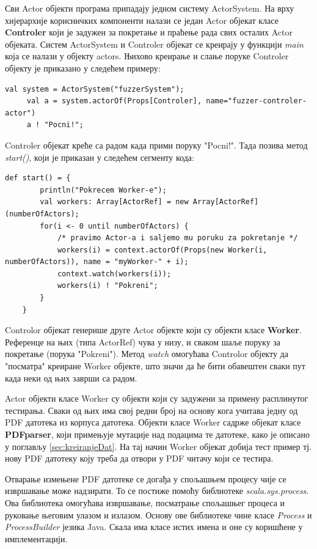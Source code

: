 \documentclass[12pt,oneside]{memoir}
\begin{document}
Сви Actor објекти програма припадају једном систему ActorSystem. На врху хијерархије корисничких компоненти налази се један Actor објекат класе \textbf{Controler} који је задужен за покретање и праћење рада свих осталих Actor објеката. Систем ActorSystem и Controler објекат се креирају у функцији \textit{main} која се налази у објекту actors.  Њихово креирање и слање поруке Controler објекту је приказано у следећем примеру:

\begin{lstlisting}[frame=single]
     val system = ActorSystem("fuzzerSystem");
     val a = system.actorOf(Props[Controler], name="fuzzer-controler-actor")
     a ! "Pocni!";
\end{lstlisting}

Controler објекат креће са радом када прими поруку "Pocni!". Тада позива метод \textit{start()}, који је приказан у следећем сегменту кода:

\begin{lstlisting}[frame=single]
    def start() = {
        println("Pokrecem Worker-e");
        val workers: Array[ActorRef] = new Array[ActorRef](numberOfActors);
        for(i <- 0 until numberOfActors) {
            /* pravimo Actor-a i saljemo mu poruku za pokretanje */
            workers(i) = context.actorOf(Props(new Worker(i, numberOfActors)), name = "myWorker-" + i);
            context.watch(workers(i));
            workers(i) ! "Pokreni";
        }
    }
\end{lstlisting}

Controlor објекат генерише друге Actor објекте који су објекти класе \textbf{Worker}. Референце на њих (типа ActorRef) чува у низу, и сваком шаље поруку за покретање (порука "Pokreni"). Метод \textit{watch} омогућава Controlor објекту да "посматра" креиране Worker објекте, што значи да ће бити обавештен сваки пут када неки од њих заврши са радом.

Actor објекти класе Worker су објекти који су задужени за примену расплинутог тестирања. Сваки од њих има свој редни број на основу кога учитава једну од PDF датотека из корпуса датотека. Објекти класе Worker садрже објекат класе \textbf{PDFparser}, који примењује мутације над подацима те датотеке, како је описано у поглављу \ref{sec:kreiranjeDat}. На тај начин Worker објекат добија тест пример тј. нову PDF датотеку коју треба да отвори у PDF читачу који се тестира.
 
Отварање измењене PDF датотеке се догађа у спољашњем процесу чије се извршавање може надзирати. То се постиже помоћу библиотеке \textit{scala.sys.process}. Ова библиотека омогућава извршавање, посматрање спољашњег процеса и руковање његовим улазом и излазом. Основу ове библиотеке чине класе \textit{Process} и \textit{ProcessBuilder} језика Java. Скала има класе истих имена и оне су коришћене у имплементацији.
\end{document}
